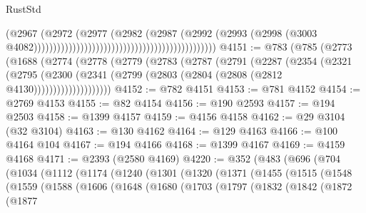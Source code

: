 \begin{lexlean}{RustStd}
\begin{coremodule}
{\begin{coremodule}
{{{{{{{{{{{{{{{{{{{{{{{{{{{{{{{{{{{{{{{{{{{{{{{{{{{{{{{                                                                                (@2967
                                                                                  (@2972
                                                                                    (@2977
                                                                                      (@2982
                                                                                        (@2987
                                                                                          (@2992
                                                                                            (@2993
                                                                                              (@2998
                                                                                                (@3003
                                                                                                  @4082)))))))))))))))))))))))))))))))))))))))))))))))
@4151 := @783
    (@785
      (@2773
        (@1688
          (@2774
            (@2778
              (@2779
                (@2783
                  (@2787
                    (@2791
                      (@2287
                        (@2354
                          (@2321
                            (@2795
                              (@2300
                                (@2341 (@2799 (@2803 (@2804 (@2808 (@2812 @4130))))))))))))))))))))
@4152 := @782 @4151
@4153 := @781 @4152
@4154 := @2769 @4153
@4155 := @82 @4154
@4156 := @190 @2593
@4157 := @194 @2503
@4158 := @1399 @4157
@4159 := @4156 @4158
@4162 := @29 @3104 (@32 @3104)
@4163 := @130 @4162
@4164 := @129 @4163
@4166 := @100 @4164 @104
@4167 := @194 @4166
@4168 := @1399 @4167
@4169 := @4159 @4168
@4171 := @2393 (@2580 @4169)
@4220 := @352
    (@483
      (@696
        (@704
          (@1034
            (@1112
              (@1174
                (@1240
                  (@1301
                    (@1320
                      (@1371
                        (@1455
                          (@1515
                            (@1548
                              (@1559
                                (@1588
                                  (@1606
                                    (@1648
                                      (@1680
                                        (@1703
                                          (@1797
                                            (@1832
                                              (@1842
                                                (@1872
                                                  (@1877
}}}}}}}}}}}}}}}}}}}}}}}}}}}}}}}}}}}}}}}}}}}}}}}}}}}}}}}
\end{coremodule}}
\end{coremodule}
\end{lexlean}
